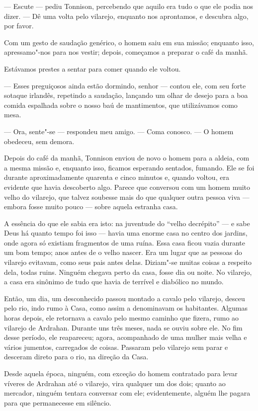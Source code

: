 --- Escute --- pediu Tonnison, percebendo que aquilo era tudo o que ele podia nos dizer. --- Dê uma volta pelo vilarejo,
enquanto nos aprontamos, e descubra algo, por favor.

Com um gesto de saudação genérico, o homem saiu em sua missão; enquanto isso, apressamo"-nos para nos vestir; depois,
começamos a preparar o café da manhã.

Estávamos prestes a sentar para comer quando ele voltou.

--- Esses preguiçosos ainda estão dormindo, senhor --- contou ele, com seu forte sotaque irlandês, repetindo a saudação,
lançando um olhar de desejo para a boa comida espalhada sobre o nosso baú de mantimentos, que utilizávamos como mesa.

--- Ora, sente"-se --- respondeu meu amigo. --- Coma conosco. --- O homem obedeceu, sem demora.

Depois do café da manhã, Tonnison enviou de novo o homem para a aldeia, com a mesma missão e, enquanto isso, ficamos
esperando sentados, fumando. Ele se foi durante aproximadamente quarenta e cinco minutos e, quando voltou, era evidente
que havia descoberto algo. Parece que conversou com um homem muito velho do vilarejo, que talvez soubesse mais
do que qualquer outra pessoa viva --- embora fosse muito pouco --- sobre aquela estranha casa.

A essência do que ele sabia era isto: na juventude do “velho decrépito” --- e sabe Deus há quanto tempo foi isso --- havia
uma enorme casa no centro dos jardins, onde agora só existiam fragmentos de uma ruína. Essa casa ficou vazia durante um
bom tempo; anos antes de o velho nascer. Era um lugar que as pessoas do vilarejo evitavam, como seus pais antes delas.
Diziam"-se muitas coisas a respeito dela, todas ruins. Ninguém chegava perto da casa, fosse dia ou noite. No
vilarejo, a casa era sinônimo de tudo que havia de terrível e diabólico no mundo.

Então, um dia, um desconhecido passou montado a cavalo pelo vilarejo, desceu pelo rio, indo rumo à Casa, como
assim a denominavam os habitantes. Algumas horas depois, ele retornava a cavalo pelo mesmo caminho que fizera, rumo ao
vilarejo de Ardrahan. Durante uns três meses, nada se ouviu sobre ele. No fim desse período, ele reapareceu;
agora, acompanhado de uma mulher mais velha e vários jumentos, carregados de coisas. Passaram pelo vilarejo sem parar e
desceram direto para o rio, na direção da Casa.

Desde aquela época, ninguém, com exceção do homem contratado para levar víveres de Ardrahan até o vilarejo, vira
qualquer um dos dois; quanto ao mercador, ninguém tentara conversar com ele; evidentemente, alguém lhe pagara para que
permanecesse em silêncio.

